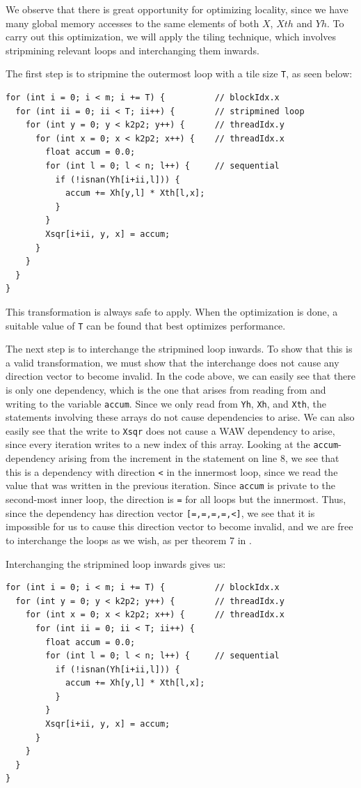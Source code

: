 We observe that there is great opportunity for optimizing locality, since we
have many global memory accesses to the same elements of both \(X\), \(Xth\)
and \(Yh\).
To carry out this optimization, we will apply the tiling technique, which
involves stripmining relevant loops and interchanging them inwards.

The first step is to stripmine the outermost loop with a tile size \texttt{T},
as seen below:
\begin{verbatim}
for (int i = 0; i < m; i += T) {          // blockIdx.x
  for (int ii = 0; ii < T; ii++) {        // stripmined loop
    for (int y = 0; y < k2p2; y++) {      // threadIdx.y
      for (int x = 0; x < k2p2; x++) {    // threadIdx.x
        float accum = 0.0;
        for (int l = 0; l < n; l++) {     // sequential
          if (!isnan(Yh[i+ii,l])) {
            accum += Xh[y,l] * Xth[l,x];
          }
        }
        Xsqr[i+ii, y, x] = accum;
      }
    }
  }
}
\end{verbatim}
This transformation is always safe to apply. When the optimization is done, a
suitable value of \texttt{T} can be found that best optimizes performance.

The next step is to interchange the stripmined loop inwards.
To show that this is a valid transformation, we must show that the interchange
does not cause any direction vector to become invalid.
In the code above, we can easily see that there is only one dependency, which
is the one that arises from reading from and writing to the variable
\texttt{accum}.
Since we only read from \texttt{Yh}, \texttt{Xh}, and \texttt{Xth}, the
statements involving these arrays do not cause dependencies to arise.
We can also easily see that the write to \texttt{Xsqr} does not cause a WAW
dependency to arise, since every iteration writes to a new index of this array.
Looking at the \texttt{accum}-dependency arising from the increment in the
statement on line 8, we see that this is a dependency with direction \texttt{<}
in the innermost loop, since we read the value that was written in the previous
iteration.
Since \texttt{accum} is private to the second-most inner loop, the direction is
\texttt{=} for all loops but the innermost.
Thus, since the dependency has direction vector \texttt{[=,=,=,=,<]}, we see
that it is impossible for us to cause this direction vector to become invalid,
and we are free to interchange the loops as we wish, as per theorem 7 in
\cite{pmph}.

Interchanging the stripmined loop inwards gives us:
\begin{verbatim}
for (int i = 0; i < m; i += T) {          // blockIdx.x
  for (int y = 0; y < k2p2; y++) {        // threadIdx.y
    for (int x = 0; x < k2p2; x++) {      // threadIdx.x
      for (int ii = 0; ii < T; ii++) {
        float accum = 0.0;
        for (int l = 0; l < n; l++) {     // sequential
          if (!isnan(Yh[i+ii,l])) {
            accum += Xh[y,l] * Xth[l,x];
          }
        }
        Xsqr[i+ii, y, x] = accum;
      }
    }
  }
}
\end{verbatim}

